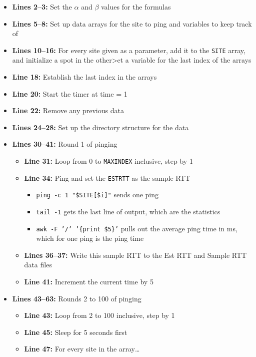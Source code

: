 \documentclass[11pt]{article}
\begin{document}
  \begin{itemize}
    \item \textbf{Lines 2--3:} Set the $\alpha$ and $\beta$ values for the formulas
    \item \textbf{Lines 5--8:} Set up data arrays for the site to ping and variables to keep track of
    \item \textbf{Lines 10--16:} For every site given as a parameter, add it to the \texttt{SITE} array, and initialize 
          a spot in the other>et a variable for the last index of the arrays
    \item \textbf{Line 18:} Establish the last index in the arrays
    \item \textbf{Line 20:} Start the timer at time = 1
    \item \textbf{Line 22:} Remove any previous data
    \item \textbf{Lines 24--28:} Set up the directory structure for the data
    \item \textbf{Lines 30--41:} Round 1 of pinging
      \begin{itemize}
        \item \textbf{Line 31:} Loop from 0 to \texttt{MAXINDEX} inclusive, step by 1
        \item \textbf{Line 34:} Ping and set the \texttt{ESTRTT} as the sample RTT
          \begin{itemize}
            \item \texttt{ping -c 1 "\${SITE[\$i]}"} sends one ping
            \item \texttt{tail -1} gets the last line of output, which are the statistics
            \item \texttt{awk -F '/' '\{print \$5\}'} pulls out the average ping time in ms, which for one ping is the ping time
          \end{itemize}
        \item \textbf{Lines 36--37:} Write this sample RTT to the Est RTT and Sample RTT data files
        \item \textbf{Line 41:} Increment the current time by 5
      \end{itemize}
    \item \textbf{Lines 43--63:} Rounds 2 to 100 of pinging
      \begin{itemize}
        \item \textbf{Line 43:} Loop from 2 to 100 inclusive, step by 1
        \item \textbf{Line 45:} Sleep for 5 seconds first
        \item \textbf{Line 47:} For every site in the array\dots

\end{itemize}
\end{itemize}
\end{document}
